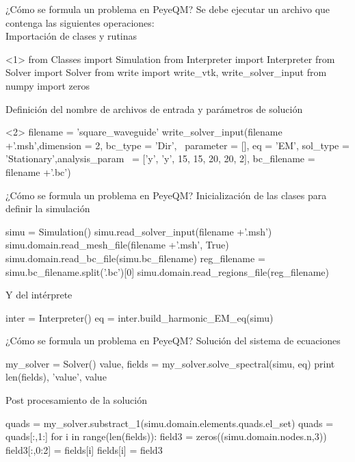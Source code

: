 \documentclass[xcolor=table,serif]{beamer}
\begin{document}
	\begin{frame}[fragile]{¿Cómo se formula un problema en PeyeQM?}
	Se debe ejecutar un archivo que contenga las siguientes operaciones:\\
		\pause
		Importación de clases y rutinas
		\begin{python}<1>
		from Classes import Simulation
		from Interpreter import Interpreter
		from Solver import Solver
		from write import write_vtk, write_solver_input 
		from numpy import zeros
		\end{python}	
		\pause 
		Definición del nombre de archivos de entrada y parámetros de solución
		\begin{python}<2>
	filename = 'square_waveguide'
	write_solver_input(filename +'.msh',dimension = 2, bc_type = 		'Dir', \
	parameter = [], eq = 'EM', sol_type = 'Stationary',analysis_param \
	= ['y', 'y', 15, 15, 20, 20, 2], bc_filename = filename +'.bc')  
		\end{python}
	\end{frame}
	\begin{frame}[fragile]{¿Cómo se formula un problema en PeyeQM?}
	Inicialización de las clases para definir la simulación
	\begin{python}
simu = Simulation()
simu.read_solver_input(filename +'.msh')
simu.domain.read_mesh_file(filename +'.msh', True)
simu.domain.read_bc_file(simu.bc_filename)
reg_filename = simu.bc_filename.split('.bc')[0]
simu.domain.read_regions_file(reg_filename)
	\end{python}
	\pause
	Y del intérprete
	\begin{python}
inter = Interpreter()
eq = inter.build_harmonic_EM_eq(simu)
	\end{python}	
	
	\end{frame}
	\begin{frame}[fragile]{¿Cómo se formula un problema en PeyeQM?}
	Solución del sistema de ecuaciones	
	\begin{python}
	my_solver = Solver()
value, fields = my_solver.solve_spectral(simu, eq)
print len(fields), 'value', value
	\end{python}
	\pause
	Post procesamiento de la solución
	\begin{python}
quads = my_solver.substract_1(simu.domain.elements.quads.el_set)
quads = quads[:,1:]
for i in range(len(fields)):
    field3 =  zeros((simu.domain.nodes.n,3))
    field3[:,0:2] = fields[i]
    fields[i] = field3
	\end{python}
	\end{frame}
\end{document}
